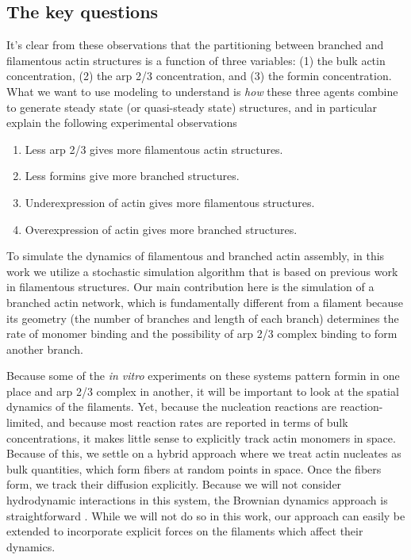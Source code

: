 \documentclass[11pt]{article}
\begin{document}
\subsection{The key questions}
It's clear from these observations that the partitioning between branched and filamentous actin structures is a function of three variables: (1) the bulk actin concentration, (2) the arp 2/3 concentration, and (3) the formin concentration. What we want to use modeling to understand is \emph{how} these three agents combine to generate steady state (or quasi-steady state) structures, and in particular explain the following experimental observations
\begin{enumerate}
\item Less arp 2/3 gives more filamentous actin structures. 
\item Less formins give more branched structures. 
\item Underexpression of actin gives more filamentous structures.
\item Overexpression of actin gives more branched structures. 
\end{enumerate}
To simulate the dynamics of filamentous and branched actin assembly, in this work we utilize a stochastic simulation algorithm that is based on previous work \cite{fass2008stochastic, banerjee2022emergence} in filamentous structures. Our main contribution here is the simulation of a branched actin network, which is fundamentally different from a filament because its geometry (the number of branches and length of each branch) determines the rate of monomer binding and the possibility of arp 2/3 complex binding to form another branch. 

Because some of the \emph{in vitro} experiments on these systems pattern formin in one place and arp 2/3 complex in another, it will be important to look at the spatial dynamics of the filaments. Yet, because the nucleation reactions are reaction-limited, and because most reaction rates are reported in terms of bulk concentrations, it makes little sense to explicitly track actin monomers in space. Because of this, we settle on a hybrid approach where we treat actin nucleates as bulk quantities, which form fibers at random points in space. Once the fibers form, we track their diffusion explicitly. Because we will not consider hydrodynamic interactions in this system, the Brownian dynamics approach is straightforward \cite{makino2004brownian, delong2015brownian}. While we will not do so in this work, our approach can easily be extended to incorporate explicit forces on the filaments which affect their dynamics. 
\end{document}
